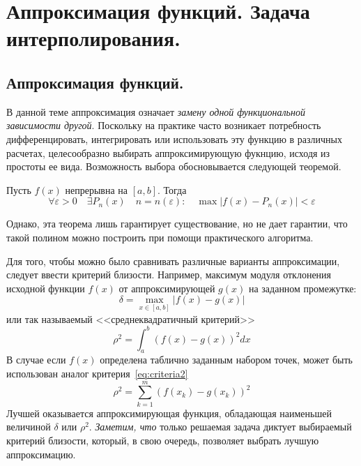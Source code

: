 \documentclass[../../calc-math-exam-2023.tex]{subfiles}
\begin{document}
    \section{Аппроксимация функций. Задача интерполирования.}\label{sec:ch05}
    \subsection{Аппроксимация функций.}
    В данной теме аппроксимация означает \emph{замену одной функциональной зависимости
    другой}. Поскольку на практике часто возникает потребность дифференцировать,
    интегрировать или использовать эту функцию в различных расчетах, целесообразно
    выбирать аппроксимирующую фукнцию, исходя из простоты ее вида. Возможность выбора
    обосновывается следующей теоремой.
    \begin{theorem}
        Пусть $f(x)$ непрерывна на $[a, b]$. Тогда
        \begin{equation*}
            \forall \varepsilon > 0 \quad \exists P_n(x) \quad n = n(\varepsilon) : \quad \max |f(x) - P_n(x)| < \varepsilon
        \end{equation*}
    \end{theorem}
    Однако, эта теорема лишь гарантирует существование, но не дает гарантии, что такой полином
    можно построить при помощи практического алгоритма.

    Для того, чтобы можно было сравнивать различные варианты аппроксимации, следует
    ввести критерий близости. Например, максимум модуля отклонения исходной функции
    $f(x)$ от аппроксимирующей $g(x)$ на заданном промежутке:
    \begin{equation}
        \delta = \max_{x \in [a, b]} |f(x) - g(x)|\label{eq:criteria1}
    \end{equation}
    или так называемый <<среднеквадратичный критерий>>
    \begin{equation}
        \rho^2 = \int_a^b \left( f(x) - g(x) \right)^2 dx\label{eq:criteria2}
    \end{equation}
    В случае если $f(x)$ определена таблично заданным набором точек, может быть использован
    аналог критерия~\eqref{eq:criteria2}
    \begin{equation}
        \rho^2 = \sum_{k=1}^m \left( f(x_k) - g(x_k) \right)^2\label{eq:criteria3}
    \end{equation}
    Лучшей оказывается аппроксимирующая функция, обладающая наименьшей величиной $\delta$ или $\rho^2$.
    \emph{Заметим, что} только решаемая задача диктует выбираемый критерий близости, который, в свою очередь,
    позволяет выбрать лучшую аппроксимацию.
\end{document}
